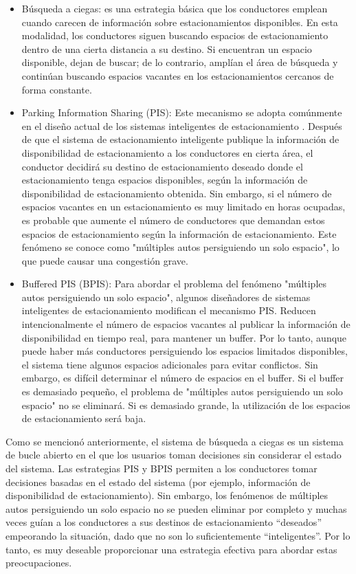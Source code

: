 \begin{itemize}
    \item Búsqueda a ciegas: es una estrategia básica que los conductores emplean cuando carecen de información sobre estacionamientos disponibles. En esta modalidad, los conductores siguen buscando espacios de estacionamiento dentro de una cierta distancia a su destino. Si encuentran un espacio disponible, dejan de buscar; de lo contrario, amplían el área de búsqueda y continúan buscando espacios vacantes en los estacionamientos cercanos de forma constante.
    \item Parking Information Sharing (PIS): Este mecanismo se adopta comúnmente en el diseño actual de los sistemas inteligentes de estacionamiento \cite{ref7}. Después de que el sistema de estacionamiento inteligente publique la información de disponibilidad de estacionamiento a los conductores en cierta área, el conductor decidirá su destino de estacionamiento deseado donde el estacionamiento tenga espacios disponibles, según la información de disponibilidad de estacionamiento obtenida. Sin embargo, si el número de espacios vacantes en un estacionamiento es muy limitado en horas ocupadas, es probable que aumente el número de conductores que demandan estos espacios de estacionamiento según la información de estacionamiento. Este fenómeno se conoce como "múltiples autos persiguiendo un solo espacio", lo que puede causar una congestión grave.
    \item Buffered PIS (BPIS): Para abordar el problema del fenómeno "múltiples autos persiguiendo un solo espacio", algunos diseñadores de sistemas inteligentes de estacionamiento modifican el mecanismo PIS. Reducen intencionalmente el número de espacios vacantes al publicar la información de disponibilidad en tiempo real, para mantener un buffer. Por lo tanto, aunque puede haber más conductores persiguiendo los espacios limitados disponibles, el sistema tiene algunos espacios adicionales para evitar conflictos. Sin embargo, es difícil determinar el número de espacios en el buffer. Si el buffer es demasiado pequeño, el problema de "múltiples autos persiguiendo un solo espacio" no se eliminará. Si es demasiado grande, la utilización de los espacios de estacionamiento será baja.
\end{itemize}

Como se mencionó anteriormente, el sistema de búsqueda a ciegas es un sistema de bucle abierto en el que los usuarios toman decisiones sin considerar el estado del sistema. Las estrategias PIS y BPIS permiten a los conductores tomar decisiones basadas en el estado del sistema (por ejemplo, información de disponibilidad de estacionamiento). Sin embargo, los fenómenos de múltiples autos persiguiendo un solo espacio no se pueden eliminar por completo y muchas veces guían a los conductores a sus destinos de estacionamiento “deseados” empeorando la situación, dado que no son lo suficientemente “inteligentes”. Por lo tanto, es muy deseable proporcionar una estrategia efectiva para abordar estas preocupaciones.

